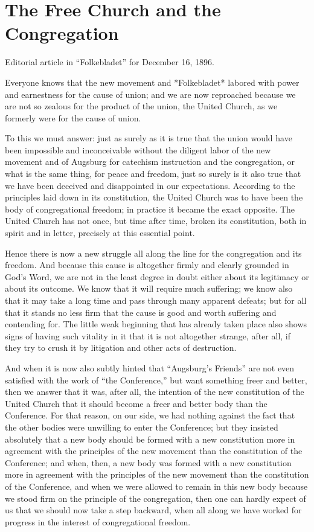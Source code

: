 
\section{The Free Church and the Congregation}

Editorial article in “Folkebladet” for December 16, 1896.

Everyone knows that the new movement and *Folkebladet* labored with power and earnestness for the cause of union; and we are now reproached because we are not so zealous for the product of the union, the United Church, as we formerly were for the cause of union.

To this we must answer: just as surely as it is true that the union would have been impossible and inconceivable without the diligent labor of the new movement and of Augsburg for catechism instruction and the congregation, or what is the same thing, for peace and freedom, just so surely is it also true that we have been deceived and disappointed in our expectations. According to the principles laid down in its constitution, the United Church was to have been the body of congregational freedom; in practice it became the exact opposite. The United Church has not once, but time after time, broken its constitution, both in spirit and in letter, precisely at this essential point.

Hence there is now a new struggle all along the line for the congregation and its freedom. And because this cause is altogether firmly and clearly grounded in God’s Word, we are not in the least degree in doubt either about its legitimacy or about its outcome. We know that it will require much suffering; we know also that it may take a long time and pass through many apparent defeats; but for all that it stands no less firm that the cause is good and worth suffering and contending for. The little weak beginning that has already taken place also shows signs of having such vitality in it that it is not altogether strange, after all, if they try to crush it by litigation and other acts of destruction.

And when it is now also subtly hinted that “Augsburg’s Friends” are not even satisfied with the work of “the Conference,” but want something freer and better, then we answer that it was, after all, the intention of the new constitution of the United Church that it should become a freer and better body than the Conference. For that reason, on our side, we had nothing against the fact that the other bodies were unwilling to enter the Conference; but they insisted absolutely that a new body should be formed with a new constitution more in agreement with the principles of the new movement than the constitution of the Conference; and when, then, a new body was formed with a new constitution more in agreement with the principles of the new movement than the constitution of the Conference, and when we were allowed to remain in this new body because we stood firm on the principle of the congregation, then one can hardly expect of us that we should now take a step backward, when all along we have worked for progress in the interest of congregational freedom.

